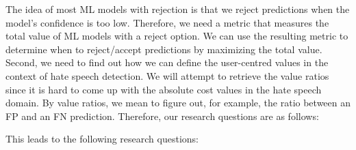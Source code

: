 The idea of most ML models with rejection is that we reject predictions when the model's confidence is too low. Therefore, we need a metric that measures the total value of ML models with a reject option. We can use the resulting metric to determine when to reject/accept predictions by maximizing the total value. Second, we need to find out how we can define the user-centred values in the context of hate speech detection. We will attempt to retrieve the value ratios since it is hard to come up with the absolute cost values in the hate speech domain. By value ratios, we mean to figure out, for example, the ratio between an FP and an FN prediction. Therefore, our research questions are as follows:

This leads to the following research questions:


\noindent{}



